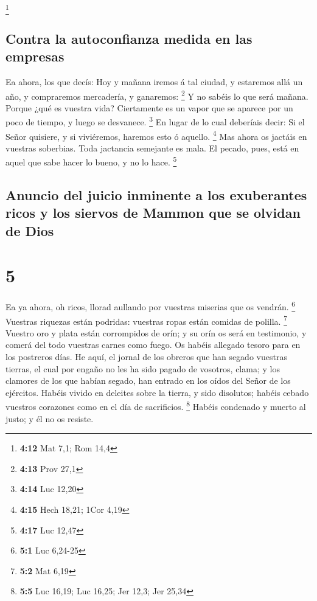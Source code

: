 \footnote{\textbf{4:12} Mat 7,1; Rom 14,4}

\hypertarget{contra-la-autoconfianza-medida-en-las-empresas}{%
\subsection{Contra la autoconfianza medida en las
empresas}\label{contra-la-autoconfianza-medida-en-las-empresas}}

 Ea ahora, los que decís: Hoy y mañana iremos á tal ciudad,
y estaremos allá un año, y compraremos mercadería, y ganaremos:
\footnote{\textbf{4:13} Prov 27,1}  Y no sabéis lo que será
mañana. Porque ¿qué es vuestra vida? Ciertamente es un vapor que se
aparece por un poco de tiempo, y luego se desvanece. \footnote{\textbf{4:14}
  Luc 12,20}  En lugar de lo cual deberíais decir: Si el
Señor quisiere, y si viviéremos, haremos esto ó aquello. \footnote{\textbf{4:15}
  Hech 18,21; 1Cor 4,19}  Mas ahora os jactáis en vuestras
soberbias. Toda jactancia semejante es mala.  El pecado,
pues, está en aquel que sabe hacer lo bueno, y no lo hace. \footnote{\textbf{4:17}
  Luc 12,47}

\hypertarget{anuncio-del-juicio-inminente-a-los-exuberantes-ricos-y-los-siervos-de-mammon-que-se-olvidan-de-dios}{%
\subsection{Anuncio del juicio inminente a los exuberantes ricos y los
siervos de Mammon que se olvidan de
Dios}\label{anuncio-del-juicio-inminente-a-los-exuberantes-ricos-y-los-siervos-de-mammon-que-se-olvidan-de-dios}}

\hypertarget{section-4}{%
\section{5}\label{section-4}}

 Ea ya ahora, oh ricos, llorad aullando por vuestras
miserias que os vendrán. \footnote{\textbf{5:1} Luc 6,24-25}
 Vuestras riquezas están podridas: vuestras ropas están
comidas de polilla. \footnote{\textbf{5:2} Mat 6,19} 
Vuestro oro y plata están corrompidos de orín; y su orín os será en
testimonio, y comerá del todo vuestras carnes como fuego. Os habéis
allegado tesoro para en los postreros días.  He aquí, el
jornal de los obreros que han segado vuestras tierras, el cual por
engaño no les ha sido pagado de vosotros, clama; y los clamores de los
que habían segado, han entrado en los oídos del Señor de los ejércitos.
 Habéis vivido en deleites sobre la tierra, y sido
disolutos; habéis cebado vuestros corazones como en el día de
sacrificios. \footnote{\textbf{5:5} Luc 16,19; Luc 16,25; Jer 12,3; Jer
  25,34}  Habéis condenado y muerto al justo; y él no os
resiste.

